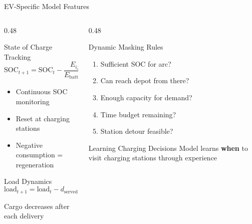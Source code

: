\documentclass[aspectratio=169,11pt]{beamer}
\begin{document}
\begin{frame}{EV-Specific Model Features}
    \begin{columns}[T]
        \begin{column}{0.48\textwidth}
            \begin{block}{State of Charge Tracking}
                \[
                \text{SOC}_{t+1} = \text{SOC}_t - \frac{E_{ij}}{E_{\text{battery}}}
                \]
                
                \begin{itemize}
                    \item Continuous SOC monitoring
                    \item Reset at charging stations
                    \item Negative consumption = regeneration
                \end{itemize}
            \end{block}
            
            \begin{block}{Load Dynamics}
                \[
                \text{load}_{t+1} = \text{load}_t - d_{\text{served}}
                \]
                
                Cargo decreases after each delivery
            \end{block}
        \end{column}
        \begin{column}{0.48\textwidth}
            \begin{block}{Dynamic Masking Rules}
                \begin{enumerate}
                    \item Sufficient SOC for arc?
                    \item Can reach depot from there?
                    \item Enough capacity for demand?
                    \item Time budget remaining?
                    \item Station detour feasible?
                \end{enumerate}
            \end{block}
            
            \begin{alertblock}{Learning Charging Decisions}
                Model learns \textbf{when} to visit charging stations through experience
            \end{alertblock}
        \end{column}
    \end{columns}
\end{frame}
\end{document}
